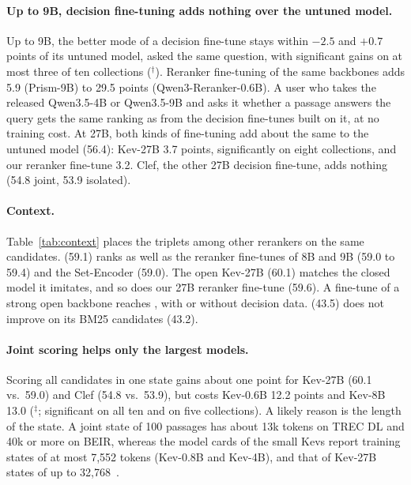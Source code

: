\paragraph{Up to 9B, decision fine-tuning adds nothing over the untuned model.}
Up to 9B, the better mode of a decision fine-tune stays within $-2.5$ and $+0.7$ points of its untuned model, asked
the same question, with significant gains on at most three of ten collections (${}^\dagger$). Reranker
fine-tuning of the same backbones adds 5.9 (Prism-9B) to 29.5 points (Qwen3-Reranker-0.6B). A user who takes the
released Qwen3.5-4B or Qwen3.5-9B and asks it whether a passage answers the query gets the same ranking as from the
decision fine-tunes built on it, at no training cost. At 27B, both kinds of fine-tuning add about the same to the untuned
model (56.4): Kev-27B 3.7 points, significantly on eight collections, and our reranker fine-tune 3.2. Clef, the other
27B decision fine-tune, adds nothing (54.8 joint, 53.9 isolated).



\paragraph{Context.}
Table~\ref{tab:context} places the triplets among other rerankers on the same candidates. \jev{} (59.1) ranks as well
as the reranker fine-tunes of 8B and 9B (59.0 to 59.4) and the Set-Encoder (59.0). The open Kev-27B (60.1) matches
the closed model it imitates, and so does our 27B reranker fine-tune (59.6). A fine-tune of a strong open backbone
reaches \jev{}, with or without decision data. \laya{} (43.5) does not improve on
its BM25 candidates (43.2).

\paragraph{Joint scoring helps only the largest models.}
Scoring all candidates in one state gains about one point for Kev-27B (60.1 vs.\ 59.0) and Clef (54.8 vs.\ 53.9), but
costs Kev-0.6B 12.2 points and Kev-8B 13.0 (${}^\ddagger$; significant on all ten and on five collections). A likely
reason is the length of the state. A joint state of 100 passages has about 13k tokens on TREC DL and 40k or more on
BEIR, whereas the model cards of the small Kevs report training states of at most 7,552 tokens (Kev-0.8B and Kev-4B),
and that of Kev-27B states of up to 32,768~\cite{KevCards}.
